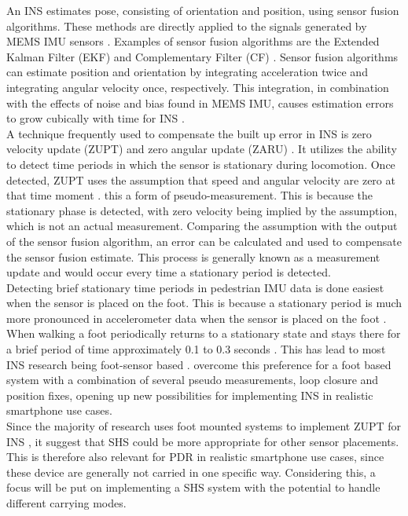 An \ac{INS} estimates pose, consisting of orientation and position, using sensor fusion algorithms. These methods are directly applied to the signals generated by MEMS IMU sensors \cite{Wu2019}. Examples of sensor fusion algorithms are the Extended Kalman Filter (EKF) and Complementary Filter (CF) \cite{Kok2017}. Sensor fusion algorithms can estimate position and orientation by integrating acceleration twice and integrating angular velocity once, respectively. This integration, in combination with the effects of noise and bias found in MEMS IMU, causes estimation errors to grow cubically with time for INS \cite{Harle2013}. \\
\newline
A technique frequently used to compensate the built up error in INS is zero velocity update (ZUPT) and zero angular update (ZARU) \cite{Harle2013}. It utilizes the ability to detect time periods in which the sensor is stationary during locomotion. Once detected, ZUPT uses the assumption that speed and angular velocity are zero at that time moment \cite{Wu2019,Harle2013}. this a form of pseudo-measurement. This is because the stationary phase is detected, with zero velocity being implied by the assumption, which is not an actual measurement. Comparing the assumption with the output of the sensor fusion algorithm, an error can be calculated and used to compensate the sensor fusion estimate. This process is generally known as a measurement update and would occur every time a stationary period is detected.\\
\newline
Detecting brief stationary time periods in pedestrian IMU data is done easiest when the sensor is placed on the foot. This is because a stationary period is much more pronounced in accelerometer data when the sensor is placed on the foot \cite{Yu2019,Wu2019}.  When walking a foot periodically returns to a stationary state and stays there for a brief period of time approximately 0.1 to 0.3 seconds \cite{Ren2016a}. This has lead to most \ac{INS} research being foot-sensor based \cite{Diez2018,Wu2019}.  \citet{Solin2018a} overcome this preference for a foot based system with a combination of several pseudo measurements, loop closure and position fixes, opening up new possibilities for implementing INS in realistic smartphone use cases.\\
Since the majority of research uses foot mounted systems to implement ZUPT for INS \cite{Wu2019}, it suggest that SHS could be more appropriate for other sensor placements. This is therefore also relevant for PDR in realistic smartphone use cases, since these device are generally not carried in one specific way. Considering this, a focus will be put on implementing a SHS system with the potential to handle different carrying modes. \\


